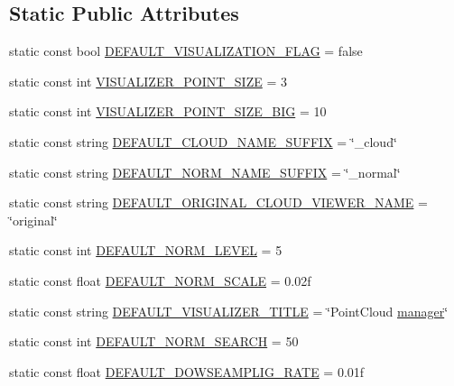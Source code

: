 \subsection*{Static Public Attributes}
\begin{DoxyCompactItemize}
\item 
static const bool \hyperlink{classpcm_1_1PCManager_aaddf643dfa30897c1851d97cc6732e73}{D\-E\-F\-A\-U\-L\-T\-\_\-\-V\-I\-S\-U\-A\-L\-I\-Z\-A\-T\-I\-O\-N\-\_\-\-F\-L\-A\-G} = false
\item 
static const int \hyperlink{classpcm_1_1PCManager_abb62ef760d6d8436c18cac80bb111898}{V\-I\-S\-U\-A\-L\-I\-Z\-E\-R\-\_\-\-P\-O\-I\-N\-T\-\_\-\-S\-I\-Z\-E} = 3
\item 
static const int \hyperlink{classpcm_1_1PCManager_a53820f1bdb5fc94830c0a04334916d12}{V\-I\-S\-U\-A\-L\-I\-Z\-E\-R\-\_\-\-P\-O\-I\-N\-T\-\_\-\-S\-I\-Z\-E\-\_\-\-B\-I\-G} = 10
\item 
static const string \hyperlink{classpcm_1_1PCManager_aceb117314161d997ffcd102c4a2e3668}{D\-E\-F\-A\-U\-L\-T\-\_\-\-C\-L\-O\-U\-D\-\_\-\-N\-A\-M\-E\-\_\-\-S\-U\-F\-F\-I\-X} = \char`\"{}\-\_\-cloud\char`\"{}
\item 
static const string \hyperlink{classpcm_1_1PCManager_a7cacb2df053d19d4d6d346a0b45082d9}{D\-E\-F\-A\-U\-L\-T\-\_\-\-N\-O\-R\-M\-\_\-\-N\-A\-M\-E\-\_\-\-S\-U\-F\-F\-I\-X} = \char`\"{}\-\_\-normal\char`\"{}
\item 
static const string \hyperlink{classpcm_1_1PCManager_adec1cf4832f6f63548aa3a4001077ec5}{D\-E\-F\-A\-U\-L\-T\-\_\-\-O\-R\-I\-G\-I\-N\-A\-L\-\_\-\-C\-L\-O\-U\-D\-\_\-\-V\-I\-E\-W\-E\-R\-\_\-\-N\-A\-M\-E} = \char`\"{}original\char`\"{}
\item 
static const int \hyperlink{classpcm_1_1PCManager_af4959e1ce5dc2650aab2754472a18ac8}{D\-E\-F\-A\-U\-L\-T\-\_\-\-N\-O\-R\-M\-\_\-\-L\-E\-V\-E\-L} = 5
\item 
static const float \hyperlink{classpcm_1_1PCManager_a95ec8d073d4a573b550a44031f986608}{D\-E\-F\-A\-U\-L\-T\-\_\-\-N\-O\-R\-M\-\_\-\-S\-C\-A\-L\-E} = 0.\-02f
\item 
static const string \hyperlink{classpcm_1_1PCManager_a87b7714f198b56306c4fc8f10b71ba27}{D\-E\-F\-A\-U\-L\-T\-\_\-\-V\-I\-S\-U\-A\-L\-I\-Z\-E\-R\-\_\-\-T\-I\-T\-L\-E} = \char`\"{}Point\-Cloud \hyperlink{obj__segmentation_8cpp_a21221f555fa05f2c3f45ff5592a25197}{manager}\char`\"{}
\item 
static const int \hyperlink{classpcm_1_1PCManager_a507973d100aef370fd7a2feeda4fb273}{D\-E\-F\-A\-U\-L\-T\-\_\-\-N\-O\-R\-M\-\_\-\-S\-E\-A\-R\-C\-H} = 50
\item 
static const float \hyperlink{classpcm_1_1PCManager_a21a35f215779915eda52dbf8d77f1e9f}{D\-E\-F\-A\-U\-L\-T\-\_\-\-D\-O\-W\-S\-E\-A\-M\-P\-L\-I\-G\-\_\-\-R\-A\-T\-E} = 0.\-01f
\end{DoxyCompactItemize}
